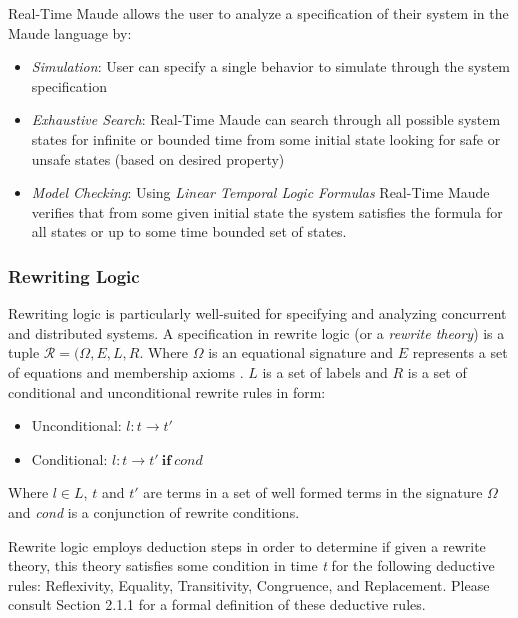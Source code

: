 \documentclass[10pt, journal]{IEEEtran}
\begin{document}
Real-Time Maude allows the user to analyze a specification of their system in the Maude language by:
\begin{itemize}
	\item \textit{Simulation}: User can specify a single behavior to simulate through the system specification
	\item \textit{Exhaustive Search}: Real-Time Maude can search through all possible system states for infinite or bounded time from some initial state looking for safe or unsafe states (based on desired property)
	\item \textit{Model Checking}: Using \textit{Linear Temporal Logic Formulas} Real-Time Maude verifies that from some given initial state the system satisfies the formula for all states or up to some time bounded set of states.
\end{itemize}

\subsubsection{Rewriting Logic}
Rewriting logic \cite{Meseguer1992} is particularly well-suited for specifying and analyzing concurrent and distributed systems. A specification in rewrite logic (or a \textit{rewrite theory}) is a tuple $\mathcal{R} = (\Omega, \mathit{E}, \mathit{L}, \mathit{R}$. Where $\Omega$ is an equational signature and $\mathit{E}$ represents a set of equations and membership axioms \cite{Lien2004}. $\mathit{L}$ is a set of labels and $\mathit{R}$ is a set of conditional and unconditional rewrite rules in form:
\begin{itemize}
	\item Unconditional: $\mathit{l} : \mathit{t} \rightarrow \mathit{t'}$
	\item Conditional: $\mathit{l} : \mathit{t} \rightarrow \mathit{t'} \: \boldsymbol{if} \: \mathit{cond}$
\end{itemize}

Where $\mathit{l} \in \mathit{L}$, $\mathit{t}$ and $\mathit{t'}$ are terms in a set of well formed terms in the signature $\Omega$ and \textit{cond} is a conjunction of rewrite conditions.

Rewrite logic employs deduction steps in order to determine if given a rewrite theory, this theory satisfies some condition in time \textit{t} for the following deductive rules: Reflexivity, Equality, Transitivity, Congruence, and Replacement. Please consult \cite{Lien2004} Section 2.1.1 for a formal definition of these deductive rules. 
\end{document}
